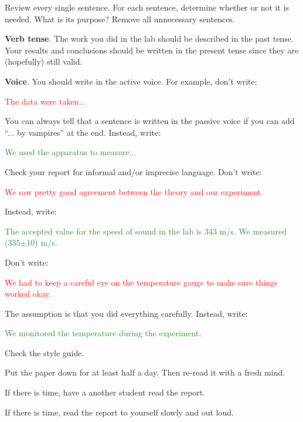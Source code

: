\documentclass[12pt]{article}
\begin{document}
\begin{todolist}

\item Review every single sentence. For each sentence, determine
  whether or not it is needed. What is its purpose? Remove all
  unnecessary sentences.
\item {\bf Verb tense}. The work you did in the lab should be
  described in the past tense. Your results and conclusions should be
  written in the present tense since they are (hopefully) still valid.
\item {\bf Voice}. You should write in the active voice. For example,
  don't write:

  \begin{em}
    \textcolor{red}{The data were taken...}
  \end{em}

  You can always tell that a sentence is written in the passive voice
  if you can add ``... by vampires'' at the end. Instead, write:

  \begin{em}
    \textcolor{ForestGreen}{We used the apparatus to measure...}
  \end{em}
\item Check your report for informal and/or imprecise language. Don't
  write:

  \begin{em}
    \textcolor{red}{We saw pretty good agreement between the theory
      and our experiment.}
  \end{em}

  Instead, write:

  \begin{em}
    \textcolor{ForestGreen}{The accepted value for the speed of sound
      in the lab is 343 m/s. We measured (335$\pm$10) m/s.}
  \end{em}

  Don't write:

  \begin{em}
    \textcolor{red}{We had to keep a careful eye on the temperature
      gauge to make sure things worked okay.}
  \end{em}

  The assumption is that you did everything carefully. Instead, write:

  \begin{em}
    \textcolor{ForestGreen}{We monitored the temperature during the
      experiment.}
  \end{em}

\item Check the style guide.
\item Put the paper down for at least half a day. Then re-read it with
  a fresh mind.
\item If there is time, have a another student read the report.
\item If there is time, read the report to yourself slowly and out
  loud.

\end{todolist}
\end{document}
